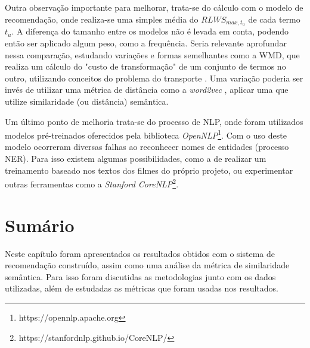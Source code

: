 Outra observação importante para melhorar, trata-se do cálculo com o modelo de recomendação, onde realiza-se uma simples média do $RLWS_{max, t_u}$ de cada termo $t_u$. A diferença do tamanho entre os modelos não é levada em conta, podendo então ser aplicado algum peso, como a frequência. Seria relevante aprofundar nessa comparação, estudando variações e formas semelhantes como a \ac{WMD}, que realiza um cálculo do "custo de transformação" de um conjunto de termos no outro, utilizando conceitos do problema do transporte \citep{Transporte:2016}. Uma variação poderia ser invés de utilizar uma métrica de distância como a \textit{word2vec} \citep{word2vec:2013}, aplicar uma que utilize similaridade (ou distância) semântica.

Um último ponto de melhoria trata-se do processo de \ac{NLP}, onde foram utilizados modelos pré-treinados oferecidos pela biblioteca \textit{OpenNLP}\footnote{https://opennlp.apache.org}. Com o uso deste modelo ocorreram diversas falhas ao reconhecer nomes de entidades (processo \ac{NER}). Para isso existem algumas possibilidades, como a de realizar um treinamento baseado nos textos dos filmes do próprio projeto, ou experimentar outras ferramentas como a \textit{Stanford CoreNLP}\footnote{https://stanfordnlp.github.io/CoreNLP/}.

\section{Sumário}

Neste capítulo foram apresentados os resultados obtidos com o sistema de recomendação construído, assim como uma análise da métrica de similaridade semântica. Para isso foram discutidas as metodologias junto com os dados utilizadas, além de estudadas as métricas que foram usadas nos resultados.